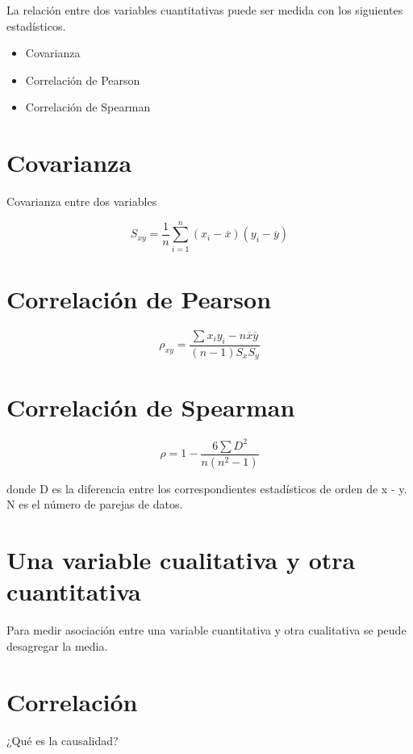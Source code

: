 \documentclass[
  letterpaper,
  DIV=11,
  numbers=noendperiod]{scrreprt}
\providecommand{\tightlist}{%
  \setlength{\itemsep}{0pt}\setlength{\parskip}{0pt}}\usepackage{longtable,booktabs,array}
\begin{document}
La relación entre dos variables cuantitativas puede ser medida con los
siguientes estadísticos.

\begin{itemize}
\tightlist
\item
  Covarianza
\item
  Correlación de Pearson
\item
  Correlación de Spearman
\end{itemize}

\section{Covarianza}\label{covarianza}

Covarianza entre dos variables

\[ S_{xy} = \frac{1}{n}\sum\limits_{i = 1}^n (x_i - \overline{x})(y_i - \overline{y})\]

\section{Correlación de Pearson}\label{correlaciuxf3n-de-pearson}

\[\rho_{xy} = \frac{\sum x_iy_i - n\overline{x}\overline{y}}{(n-1)S_xS_y}\]

\section{Correlación de Spearman}\label{correlaciuxf3n-de-spearman}

\[\rho = 1 - \frac{6\sum D^2}{n(n^2 - 1)}\]

donde D es la diferencia entre los correspondientes estadísticos de
orden de x - y. N es el número de parejas de datos.

\section{Una variable cualitativa y otra
cuantitativa}\label{una-variable-cualitativa-y-otra-cuantitativa}

Para medir asociación entre una variable cuantitativa y otra cualitativa
se peude desagregar la media.

\section{Correlación}\label{correlaciuxf3n-1}

¿Qué es la causalidad?
\end{document}
